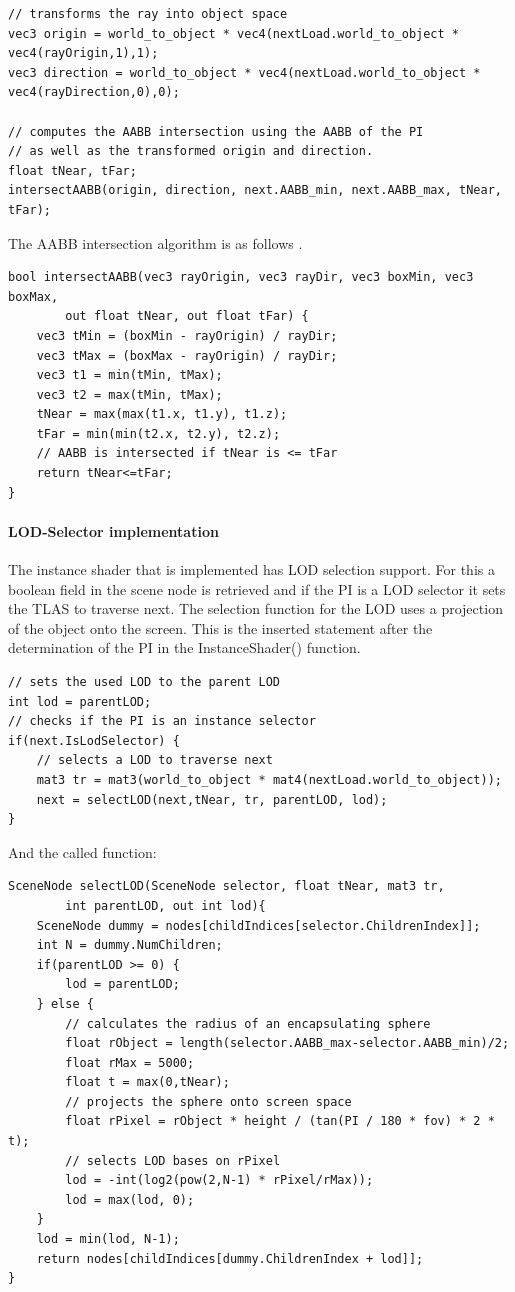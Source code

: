 \begin{lstlisting}
// transforms the ray into object space
vec3 origin = world_to_object * vec4(nextLoad.world_to_object * vec4(rayOrigin,1),1);
vec3 direction = world_to_object * vec4(nextLoad.world_to_object * vec4(rayDirection,0),0);

// computes the AABB intersection using the AABB of the PI 
// as well as the transformed origin and direction.
float tNear, tFar;
intersectAABB(origin, direction, next.AABB_min, next.AABB_max, tNear, tFar);
\end{lstlisting}

The AABB intersection algorithm is as follows \cite{pbrBook}.
\begin{lstlisting}
bool intersectAABB(vec3 rayOrigin, vec3 rayDir, vec3 boxMin, vec3 boxMax, 
        out float tNear, out float tFar) {
	vec3 tMin = (boxMin - rayOrigin) / rayDir;
	vec3 tMax = (boxMax - rayOrigin) / rayDir;
	vec3 t1 = min(tMin, tMax);
	vec3 t2 = max(tMin, tMax);
	tNear = max(max(t1.x, t1.y), t1.z);
	tFar = min(min(t2.x, t2.y), t2.z);
	// AABB is intersected if tNear is <= tFar
	return tNear<=tFar;
}
\end{lstlisting}
\newpage
\paragraph{LOD-Selector implementation}
\label{sec:ImplLOD}
The instance shader that is implemented has LOD selection support. For this a boolean field in the scene node is retrieved and if the PI is a LOD selector it sets the TLAS to traverse next. The selection function for the LOD uses a projection of the object onto the screen. This is the inserted statement after the determination of the PI in the InstanceShader() function.
\begin{lstlisting}
// sets the used LOD to the parent LOD
int lod = parentLOD;
// checks if the PI is an instance selector
if(next.IsLodSelector) {
    // selects a LOD to traverse next
	mat3 tr = mat3(world_to_object * mat4(nextLoad.world_to_object));
	next = selectLOD(next,tNear, tr, parentLOD, lod);
}
\end{lstlisting}
And the called function:
\begin{lstlisting}
SceneNode selectLOD(SceneNode selector, float tNear, mat3 tr, 
        int parentLOD, out int lod){
	SceneNode dummy = nodes[childIndices[selector.ChildrenIndex]];
	int N = dummy.NumChildren;
	if(parentLOD >= 0) {
		lod = parentLOD;
	} else {
	    // calculates the radius of an encapsulating sphere
		float rObject = length(selector.AABB_max-selector.AABB_min)/2;
		float rMax = 5000;
		float t = max(0,tNear);
		// projects the sphere onto screen space
		float rPixel = rObject * height / (tan(PI / 180 * fov) * 2 * t);
		// selects LOD bases on rPixel
		lod = -int(log2(pow(2,N-1) * rPixel/rMax));
		lod = max(lod, 0);
	}
	lod = min(lod, N-1);
	return nodes[childIndices[dummy.ChildrenIndex + lod]];
}
\end{lstlisting}

